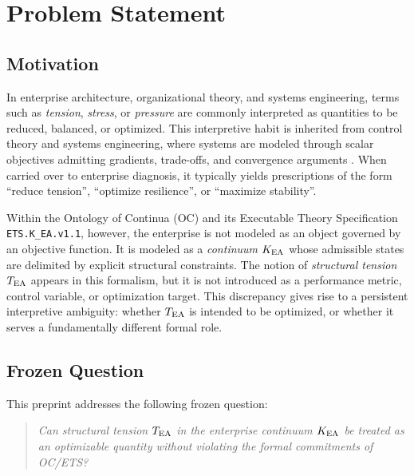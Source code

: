 ﻿%

\section{Problem Statement}

\subsection{Motivation}

In enterprise architecture, organizational theory, and systems engineering,
terms such as \emph{tension}, \emph{stress}, or \emph{pressure} are commonly
interpreted as quantities to be reduced, balanced, or optimized. This
interpretive habit is inherited from control theory and systems
engineering, where systems are modeled through scalar objectives admitting
gradients, trade-offs, and convergence arguments
\cite{kalman1960,slotine1991,ljung1999}. When carried over to enterprise
diagnosis, it typically yields prescriptions of the form ``reduce
tension'', ``optimize resilience'', or ``maximize stability''.

Within the Ontology of Continua (OC) and its Executable Theory Specification
\texttt{ETS.K\_EA.v1.1}, however, the enterprise is not modeled as an object
governed by an objective function. It is modeled as a \emph{continuum}
$K_{\mathrm{EA}}$ whose admissible states are delimited by explicit structural
constraints. The notion of \emph{structural tension} $T_{\mathrm{EA}}$ appears in this
formalism, but it is not introduced as a performance metric, control
variable, or optimization target. This discrepancy gives rise to a
persistent interpretive ambiguity: whether $T_{\mathrm{EA}}$ is intended to be
optimized, or whether it serves a fundamentally different formal role.

\subsection{Frozen Question}

This preprint addresses the following frozen question:

\begin{quote}
\emph{Can structural tension $T_{\mathrm{EA}}$ in the enterprise continuum $K_{\mathrm{EA}}$ be
treated as an optimizable quantity without violating the formal
commitments of OC/ETS?}
\end{quote}

